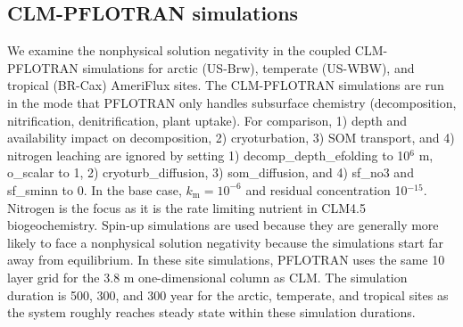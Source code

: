 \documentclass[gmd, manuscript]{copernicus}
\begin{document}
%

\subsection{CLM-PFLOTRAN simulations}
We examine the nonphysical solution negativity in the coupled CLM-PFLOTRAN simulations
for arctic (US-Brw), temperate (US-WBW), and tropical (BR-Cax) AmeriFlux sites. 
The CLM-PFLOTRAN simulations are run in the mode that PFLOTRAN only handles
subsurface chemistry (decomposition, nitrification, denitrification, 
plant uptake). For comparison, 1) depth and 
availability impact on decomposition, 2) cryoturbation, 3) SOM transport,
and 4) nitrogen leaching 
are ignored by setting 1) decomp\_depth\_efolding to 10$^6$ m, o\_scalar to 1,
2) cryoturb\_diffusion, 3) som\_diffusion, and 4) sf\_no3 and sf\_sminn to 0. In the base case, 
$k_\text{m}=10^{-6}$ and residual concentration 10$^{-15}$.
Nitrogen is the focus
as it is the rate limiting nutrient in CLM4.5 biogeochemistry. Spin-up
simulations are used because they are generally more likely to face a nonphysical solution negativity 
because the simulations start far away from equilibrium. In these site
simulations, PFLOTRAN uses the same 10 layer grid for the 3.8 m one-dimensional
column as CLM. The simulation duration is 500, 300, and 300 year for the
arctic, temperate, and tropical sites as the system roughly reaches steady state
within these simulation durations. 

\end{document}
